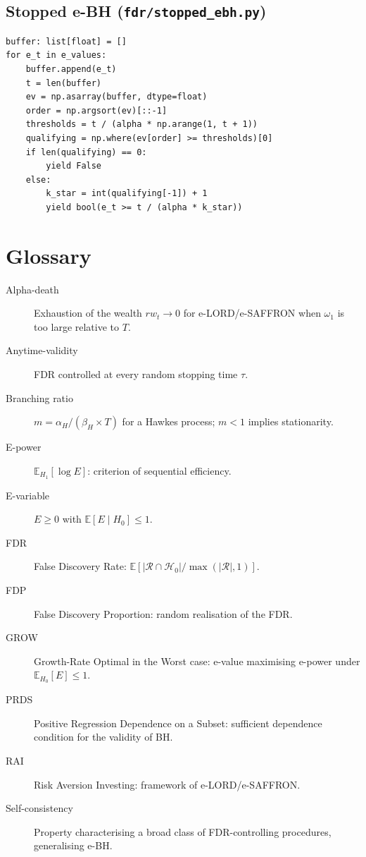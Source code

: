 \documentclass[11pt,a4paper,twocolumn]{article}
\theoremstyle{plain}
\theoremstyle{definition}
\theoremstyle{remark}
\newcommand{\E}{\mathbb{E}}
\begin{document}
\subsection{Stopped e-BH (\texttt{fdr/stopped\_ebh.py})}

\begin{lstlisting}[caption={Offline e-BH recomputed at each step.}]
buffer: list[float] = []
for e_t in e_values:
    buffer.append(e_t)
    t = len(buffer)
    ev = np.asarray(buffer, dtype=float)
    order = np.argsort(ev)[::-1]
    thresholds = t / (alpha * np.arange(1, t + 1))
    qualifying = np.where(ev[order] >= thresholds)[0]
    if len(qualifying) == 0:
        yield False
    else:
        k_star = int(qualifying[-1]) + 1
        yield bool(e_t >= t / (alpha * k_star))
\end{lstlisting}

\section{Glossary}
\label{ann:glossaire}

\begin{description}
  \item[Alpha-death] Exhaustion of the wealth $rw_t \to 0$ for e-LORD/e-SAFFRON
    when $\omega_1$ is too large relative to $T$.
  \item[Anytime-validity] FDR controlled at every random stopping time
    $\tau$.
  \item[Branching ratio] $m = \alpha_H / (\beta_H \times T)$ for a Hawkes
    process; $m < 1$ implies stationarity.
  \item[E-power] $\E_{H_1}[\log E]$: criterion of sequential efficiency.
  \item[E-variable] $E \ge 0$ with $\E[E \mid H_0] \le 1$.
  \item[FDR] False Discovery Rate: $\E[|\mathcal{R}\cap\mathcal{H}_0| / \max(|\mathcal{R}|,1)]$.
  \item[FDP] False Discovery Proportion: random realisation of the FDR.
  \item[GROW] Growth-Rate Optimal in the Worst case: e-value maximising
    e-power under $\E_{H_0}[E] \le 1$.
  \item[PRDS] Positive Regression Dependence on a Subset: sufficient
    dependence condition for the validity of BH.
  \item[RAI] Risk Aversion Investing: framework of e-LORD/e-SAFFRON.
  \item[Self-consistency] Property characterising a broad class of
    FDR-controlling procedures, generalising e-BH.
\end{description}
\end{document}
